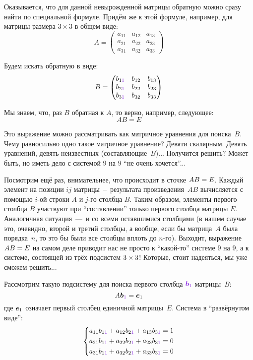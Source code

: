 \documentclass[a4paper,12pt]{article}
\theoremstyle{remark}
\begin{document}
  Оказывается, что для данной невырожденной матрицы обратную можно сразу найти по специальной формуле.
  Придём же к этой формуле, например, для матрицы размера $3 \times 3$ в общем виде:
  \[
    A = \begin{pmatrix}
      a_{11} & a_{12} & a_{13}\\
      a_{21} & a_{22} & a_{23}\\
      a_{31} & a_{32} & a_{33}
    \end{pmatrix}
  \]
  
  Будем искать обратную в виде:
  \[
    B = \begin{pmatrix}
      b_{1\textcolor{light-purple}{1}} & b_{12} & b_{13}\\
      b_{2\textcolor{light-purple}{1}} & b_{22} & b_{23}\\
      b_{3\textcolor{light-purple}{1}} & b_{32} & b_{33}
    \end{pmatrix}
  \]
  
  Мы знаем, что, раз $B$ обратная к $A$, то верно, например, следующее:
  \[
    AB = E
  \]
  
  Это выражение можно рассматривать как матричное уравнения для поиска~$B$.
  Чему равносильно одно такое матричное уравнение?
  Девяти скалярным.
  Девять уравнений, девять неизвестных (составляющие~$B$)...
  Получится решить?
  Может быть, но иметь дело с системой $9$ на $9$ ``не очень хочется''...
  
  Посмотрим ещё раз, внимательнее, что происходит в сточке $AB \hm= E$.
  Каждый элемент на позиции $ij$ матрицы~--~результата произведения~$AB$ вычисляется с помощью $i$-ой строки $A$ и $j$-го столбца $B$.
  Таким образом, элементы первого столбца $B$ участвуют при ``составлении'' только первого столбца матрицы $E$.
  Аналогичная ситуация~---~и со всеми оставшимися столбцами (в нашем случае это, очевидно, второй и третий столбцы, а вообще, если бы матрица~$A$ была порядка~$n$, то это бы были все столбцы вплоть до $n$-го).
  Выходит, выражение $AB \hm= E$ на самом деле приводит нас не просто к ``какой-то'' системе $9$ на $9$, а к системе, состоящей из трёх подсистем $3 \hm\times 3$!
  Которые, стоит надеяться, мы уже сможем решить...
  
  Рассмотрим такую подсистему для поиска первого столбца $\textcolor{light-purple}{\bds b_1}$ матрицы~$B$:
  \[
    A \bds b_{\textcolor{light-purple}{1}} = \bds e_1
  \]
  где $\boldsymbol e_1$ означает первый столбец единичной матрицы~$E$.
  Система в ``развёрнутом виде'':
  \[
    \left\{
      \begin{aligned}
        &a_{11} b_{1\textcolor{light-purple}{1}} + a_{12} b_{2\textcolor{light-purple}{1}} + a_{13} b_{3\textcolor{light-purple}{1}} = 1\\
        &a_{21} b_{1\textcolor{light-purple}{1}} + a_{22} b_{2\textcolor{light-purple}{1}} + a_{23} b_{3\textcolor{light-purple}{1}} = 0\\
        &a_{31} b_{1\textcolor{light-purple}{1}} + a_{32} b_{2\textcolor{light-purple}{1}} + a_{33} b_{3\textcolor{light-purple}{1}} = 0
      \end{aligned}
    \right.
  \]
  
\end{document}
